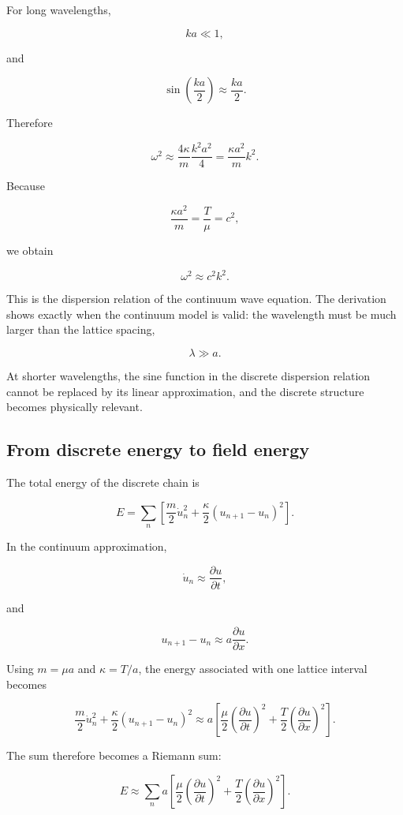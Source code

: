 For long wavelengths,

\[
ka\ll 1,
\]

and

\[
\sin\left(\frac{ka}{2}\right)
\approx
\frac{ka}{2}.
\]

Therefore

\[
\omega^{2}
\approx
\frac{4\kappa}{m}
\frac{k^{2}a^{2}}{4}
=
\frac{\kappa a^{2}}{m}k^{2}.
\]

Because

\[
\frac{\kappa a^{2}}{m}
=
\frac{T}{\mu}
=
c^{2},
\]

we obtain

\[
\boxed{
\omega^{2}\approx c^{2}k^{2}
}.
\]

This is the dispersion relation of the continuum wave equation. The derivation shows exactly when the continuum model is valid: the wavelength must be much larger than the lattice spacing,

\[
\lambda\gg a.
\]

At shorter wavelengths, the sine function in the discrete dispersion relation cannot be replaced by its linear approximation, and the discrete structure becomes physically relevant.

\subsection{From discrete energy to field energy}

The total energy of the discrete chain is

\[
E
=
\sum_{n}
\left[
\frac{m}{2}\dot{u}_{n}^{2}
+
\frac{\kappa}{2}
(u_{n+1}-u_{n})^{2}
\right].
\]

In the continuum approximation,

\[
\dot{u}_{n}
\approx
\frac{\partial u}{\partial t},
\]

and

\[
u_{n+1}-u_{n}
\approx
a\frac{\partial u}{\partial x}.
\]

Using \(m=\mu a\) and \(\kappa=T/a\), the energy associated with one lattice interval becomes

\[
\frac{m}{2}\dot{u}_{n}^{2}
+
\frac{\kappa}{2}(u_{n+1}-u_{n})^{2}
\approx
a
\left[
\frac{\mu}{2}
\left(\frac{\partial u}{\partial t}\right)^{2}
+
\frac{T}{2}
\left(\frac{\partial u}{\partial x}\right)^{2}
\right].
\]

The sum therefore becomes a Riemann sum:

\[
E
\approx
\sum_{n}a
\left[
\frac{\mu}{2}
\left(\frac{\partial u}{\partial t}\right)^{2}
+
\frac{T}{2}
\left(\frac{\partial u}{\partial x}\right)^{2}
\right].
\]

